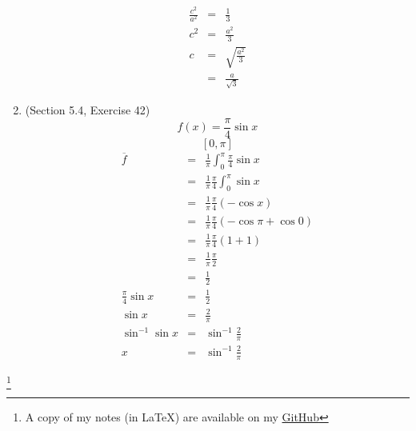 \documentclass{article}
\newcommand\blfootnote[1]{
    \begingroup
    \renewcommand\thefootnote{}\footnote{#1}
    \addtocounter{footnote}{-1}
    \endgroup
}
\begin{document}
\begin{enumerate}
\begin{eqnarray}
            \frac{c^2}{a^2} &=& \frac{1}{3} \\
            c^2 &=& \frac{a^2}{3} \\
            c &=& \sqrt{\frac{a^2}{3}} \\
              &=& \frac{a}{\sqrt{3}}
        \end{eqnarray}
    \item (Section 5.4, Exercise 42)
        $$f(x) = \frac{\pi}{4}\sin{x}$$
        $$[0, \pi]$$
        \begin{eqnarray}
            \overline{f} &=& \frac{1}{\pi}\int_0^{\pi}{\frac{\pi}{4}\sin{x}} \\
                         &=& \frac{1}{\pi}\frac{\pi}{4}\int_0^{\pi}{\sin{x}} \\
                         &=& \frac{1}{\pi}\frac{\pi}{4}\left(-\cos{x}\right) \\
                         &=& \frac{1}{\pi}\frac{\pi}{4}\left(-\cos{\pi} + \cos{0}\right) \\
                         &=& \frac{1}{\pi}\frac{\pi}{4}\left(1 + 1\right) \\
                         &=& \frac{1}{\pi}\frac{\pi}{2} \\
                         &=& \frac{1}{2} \\
            \frac{\pi}{4}\sin{x} &=& \frac{1}{2} \\
            \sin{x} &=& \frac{2}{\pi} \\
            \sin^{-1}{\sin{x}} &=& \sin^{-1}{\frac{2}{\pi}} \\
            x &=& \sin^{-1}{\frac{2}{\pi}}
        \end{eqnarray}
\end{enumerate}

\blfootnote{A copy of my notes (in \LaTeX) are available on my \href{https://github.com/onlinechronically/MATH-211}{GitHub}}
\end{document}
